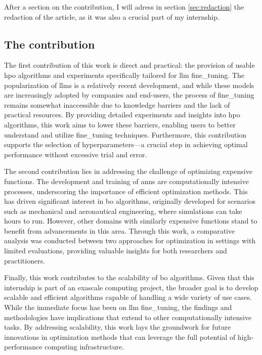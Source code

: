 After a section on the contribution, I will adress in section \ref{sec:redaction} the redaction of the article, as it was also a crucial part of my internship.

\subsection{The contribution}
\label{sec:contribution}
The first contribution of this work is direct and practical: the provision of usable \acrshort{hpo} algorithms and experiments specifically tailored for \acrshort{llm} \gls{fine_tuning}. The popularization of \acrshort{llm}s is a relatively recent development, and while these models are increasingly adopted by companies and end-users, the process of \gls{fine_tuning} remains somewhat inaccessible due to knowledge barriers and the lack of practical resources. By providing detailed experiments and insights into \acrshort{hpo} algorithms, this work aims to lower these barriers, enabling users to better understand and utilize \gls{fine_tuning} techniques. Furthermore, this contribution supports the selection of \glspl{hyperparameter}—a crucial step in achieving optimal performance without excessive trial and error.

The second contribution lies in addressing the challenge of optimizing expensive functions. The development and training of \acrshort{ann}s are computationally intensive processes, underscoring the importance of efficient optimization methods. This has driven significant interest in \acrshort{bo} algorithms, originally developed for scenarios such as mechanical and aeronautical engineering, where simulations can take hours to run. However, other domains with similarly expensive functions stand to benefit from advancements in this area. Through this work, a comparative analysis was conducted between two approaches for optimization in settings with limited evaluations, providing valuable insights for both researchers and practitioners.

Finally, this work contributes to the scalability of \acrshort{bo} algorithms. Given that this internship is part of an exascale computing project, the broader goal is to develop scalable and efficient algorithms capable of handling a wide variety of use cases. While the immediate focus has been on \acrshort{llm} \gls{fine_tuning}, the findings and methodologies have implications that extend to other computationally intensive tasks. By addressing scalability, this work lays the groundwork for future innovations in optimization methods that can leverage the full potential of high-performance computing infrastructure.


